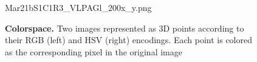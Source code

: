 \begin{figure}
    \centering
    \vspace{1.5cm}
    Mar21bS1C1R3\_VLPAGl\_200x\_y.png   
    \caption{\textbf{Colorspace.} Two images represented as 3D points according to their RGB (left) and HSV (right) encodings. 
    Each point is colored as the corresponding pixel in the original image
    }
    \label{fig:dataset:colorspace}
\end{figure}

